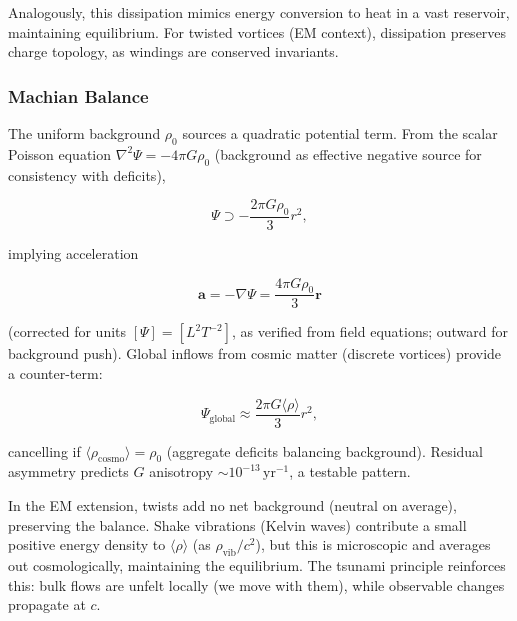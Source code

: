 Analogously, this dissipation mimics energy conversion to heat in a vast reservoir, maintaining equilibrium. For twisted vortices (EM context), dissipation preserves charge topology, as windings are conserved invariants.

\subsubsection{Machian Balance}
The uniform background $\rho_0$ sources a quadratic potential term. From the scalar Poisson equation $\nabla^2 \Psi = -4\pi G \rho_0$ (background as effective negative source for consistency with deficits),

\begin{equation}
\Psi \supset -\frac{2\pi G \rho_0}{3} r^2,
\end{equation}

implying acceleration

\begin{equation}
\mathbf{a} = -\nabla \Psi = \frac{4\pi G \rho_0}{3} \mathbf{r}
\end{equation}

(corrected for units $[\Psi] = [L^2 T^{-2}]$, as verified from field equations; outward for background push). Global inflows from cosmic matter (discrete vortices) provide a counter-term:

\begin{equation}
\Psi_{\text{global}} \approx \frac{2\pi G \langle \rho \rangle}{3} r^2,
\end{equation}

cancelling if $\langle \rho_\text{cosmo} \rangle = \rho_0$ (aggregate deficits balancing background). Residual asymmetry predicts $G$ anisotropy $\sim 10^{-13} \,\mathrm{yr}^{-1}$, a testable pattern.

In the EM extension, twists add no net background (neutral on average), preserving the balance. Shake vibrations (Kelvin waves) contribute a small positive energy density to $\langle \rho \rangle$ (as $\rho_{\text{vib}} / c^2$), but this is microscopic and averages out cosmologically, maintaining the equilibrium. The tsunami principle reinforces this: bulk flows are unfelt locally (we move with them), while observable changes propagate at $c$.

\medskip

